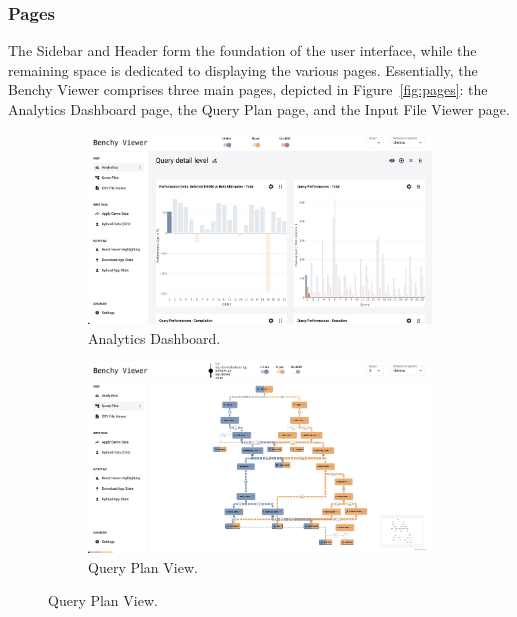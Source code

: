 \subsubsection{Pages}

The Sidebar and Header form the foundation of the user interface, while the remaining space is dedicated to displaying the various pages. Essentially, the Benchy Viewer comprises three main pages, depicted in Figure~\ref{fig:pages}: the Analytics Dashboard page, the Query Plan page, and the Input File Viewer page.

\begin{figure}[h]
  \centering
  \begin{subfigure}[b]{0.3\linewidth}
    \includegraphics[width=\linewidth]{figures/app.png}
    \caption{Analytics Dashboard.}
      \label{fig:app-page}
  \end{subfigure}
  \hspace{0.5cm} %
  \begin{subfigure}[b]{0.3\linewidth}
    \includegraphics[width=\linewidth]{figures/app-query-plan.png}
    \caption{Query Plan View.}

\end{subfigure}
\end{figure}
